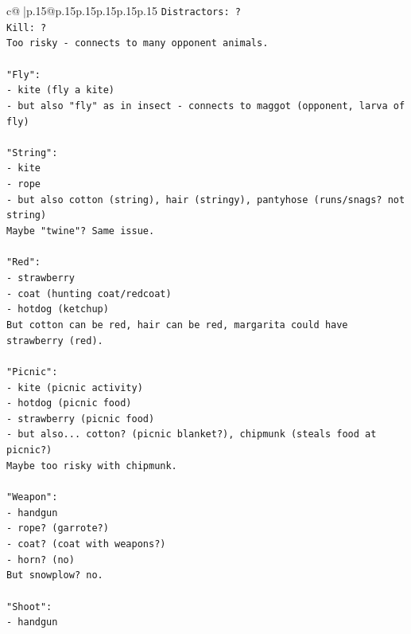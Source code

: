 \documentclass{article}
\begin{document}
{\begin{supertabular}{c@{$\;$}|p{.15\linewidth}@{}p{.15\linewidth}p{.15\linewidth}p{.15\linewidth}p{.15\linewidth}p{.15\linewidth}}
{{{\texttt{Distractors: ?} \\
\texttt{Kill: ?} \\
\texttt{Too risky {-} connects to many opponent animals.} \\
\\ 
\texttt{"Fly":} \\
\texttt{{-} kite (fly a kite)} \\
\texttt{{-} but also "fly" as in insect {-} connects to maggot (opponent, larva of fly)} \\
\\ 
\texttt{"String":} \\
\texttt{{-} kite} \\
\texttt{{-} rope} \\
\texttt{{-} but also cotton (string), hair (stringy), pantyhose (runs/snags? not string)} \\
\texttt{Maybe "twine"? Same issue.} \\
\\ 
\texttt{"Red":} \\
\texttt{{-} strawberry} \\
\texttt{{-} coat (hunting coat/redcoat)} \\
\texttt{{-} hotdog (ketchup)} \\
\texttt{But cotton can be red, hair can be red, margarita could have strawberry (red).} \\
\\ 
\texttt{"Picnic":} \\
\texttt{{-} kite (picnic activity)} \\
\texttt{{-} hotdog (picnic food)} \\
\texttt{{-} strawberry (picnic food)} \\
\texttt{{-} but also... cotton? (picnic blanket?), chipmunk (steals food at picnic?)} \\
\texttt{Maybe too risky with chipmunk.} \\
\\ 
\texttt{"Weapon":} \\
\texttt{{-} handgun} \\
\texttt{{-} rope? (garrote?)} \\
\texttt{{-} coat? (coat with weapons?)} \\
\texttt{{-} horn? (no)} \\
\texttt{But snowplow? no.} \\
\\ 
\texttt{"Shoot":} \\
\texttt{{-} handgun} \\
}}}
\end{supertabular}}
\end{document}
